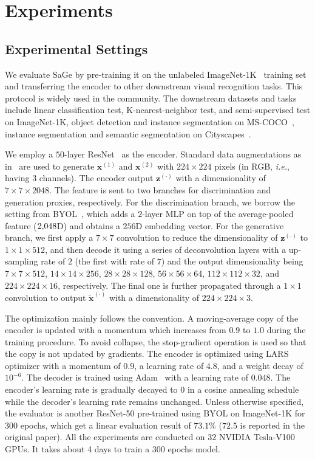 \documentclass[10pt,twocolumn,letterpaper]{article}
\begin{document}
\section{Experiments}
\label{sec:experiment}

\subsection{Experimental Settings}
\label{exp:details}

We evaluate SaGe by pre-training it on the unlabeled ImageNet-1K~\cite{russakovsky2015imagenet} training set and transferring the encoder to other downstream visual recognition tasks. This protocol is widely used in the community. The downstream datasets and tasks include linear classification test, K-nearest-neighbor test, and semi-supervised test on ImageNet-1K, object detection and instance segmentation on MS-COCO~\cite{lin2014coco}, instance segmentation and semantic segmentation on Cityscapes~\cite{cordts2016cityscapes}.

We employ a $50$-layer ResNet~\cite{he2016deep} as the encoder. Standard data augmentations as in~\cite{grill2020bootstrap} are used to generate $\mathbf{x}^{(1)}$ and $\mathbf{x}^{(2)}$ with $224\times224$ pixels (in RGB, \textit{i.e.}, having $3$ channels). The encoder output $\mathbf{z}^{(\cdot)}$ with a dimensionality of $7\times7\times2048$. The feature is sent to two branches for discrimination and generation proxies, respectively. For the discrimination branch, we borrow the setting from BYOL~\cite{grill2020bootstrap}, which adds a $2$-layer MLP on top of the average-pooled feature ($2\rm{,}048$D) and obtains a $256$D embedding vector. For the generative branch, we first apply a $7\times7$ convolution to reduce the dimensionality of $\mathbf{z}^{(\cdot)}$ to $1\times1\times512$, and then decode it using a series of deconvolution layers with a up-sampling rate of $2$ (the first with rate of $7$) and the output dimensionality being $7\times7\times512$, $14\times14\times256$, $28\times28\times128$, $56\times56\times64$, $112\times112\times32$, and $224\times224\times16$, respectively. The final one is further propagated through a $1\times1$ convolution to output $\tilde{\mathbf{x}}^{(\cdot)}$ with a dimensionality of $224\times224\times3$.

The optimization mainly follows the convention. A moving-average copy of the encoder is updated with a momentum which increases from $0.9$ to $1.0$ during the training procedure. To avoid collapse, the stop-gradient operation is used so that the copy is not updated by gradients. The encoder is optimized using LARS~\cite{huo2021large} optimizer with a momentum of $0.9$, a learning rate of $4.8$, and a weight decay of $10^{-6}$. The decoder is trained using Adam~\cite{adam} with a learning rate of $0.048$. The encoder's learning rate is gradually decayed to $0$ in a cosine annealing schedule while the decoder's learning rate remains unchanged. Unless otherwise specified, the evaluator is another ResNet-50 pre-trained using BYOL on ImageNet-1K for $300$ epochs, which get a linear evaluation result of $73.1\%$ ($72.5$ is reported in the original paper). All the experiments are conducted on 32 NVIDIA Tesla-V100 GPUs.
It takes about 4 days to train a 300 epochs model.
\end{document}
